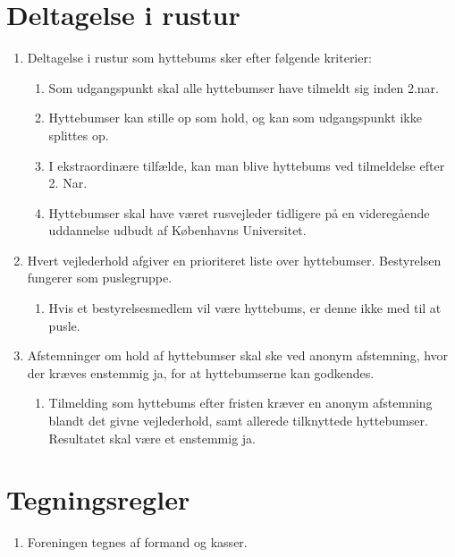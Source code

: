\documentclass[a4paper, 10pt]{article}
\renewcommand\thesection{\textsection\arabic{section}}
\newenvironment{stykenum}{
  \begin{enumerate}[%
    label=Stk.~\arabic*:, ref=\thesection~Stk.~\arabic{enumi}, start=1]
}{\end{enumerate}}
\newenvironment{substykenum}{
  \begin{enumerate}[%
          label=Stk.~\arabic{enumi}.\arabic*:,
      ref=\thesection~Stk.~\arabic{enumi}.\arabic*, start=1]
}{\end{enumerate}}
\begin{document}
\section{Deltagelse i rustur}
\begin{stykenum}
    \item Deltagelse i rustur som hyttebums sker efter følgende kriterier:
    \begin{substykenum}
        \item Som udgangspunkt skal alle hyttebumser have tilmeldt sig inden
            2.nar.
        \item Hyttebumser kan stille op som hold, og kan som udgangspunkt ikke
            splittes op.
        \item I ekstraordinære tilfælde, kan man blive hyttebums ved tilmeldelse
            efter 2. Nar.
        \item Hyttebumser skal have været rusvejleder tidligere på en videregående uddannelse udbudt af Københavns Universitet. 
    \end{substykenum}
    \item Hvert vejlederhold afgiver en prioriteret liste over hyttebumser.
        Bestyrelsen fungerer som puslegruppe.
        \begin{substykenum}
            \item Hvis et bestyrelsesmedlem vil være hyttebums, er denne ikke
                med til at pusle.
        \end{substykenum}
    \item Afstemninger om hold af hyttebumser skal ske ved anonym afstemning,
        hvor der kræves enstemmig ja, for at hyttebumserne kan godkendes.
        \begin{substykenum}
            \item Tilmelding som hyttebums efter fristen kræver en anonym
                afstemning blandt det givne vejlederhold, samt allerede
                tilknyttede hyttebumser. Resultatet skal være et enstemmig ja.
        \end{substykenum}
\end{stykenum}

\section{Tegningsregler}
\begin{stykenum}
    \item Foreningen tegnes af formand og kasser.
\end{stykenum}
\end{document}
